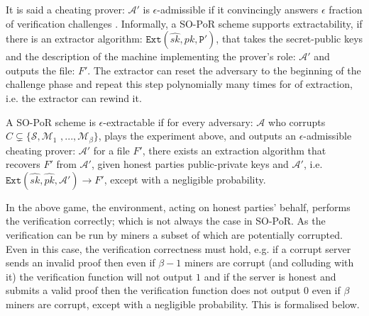 It is said a cheating prover: $\mathcal{A}'$ is $\epsilon$-admissible if it convincingly answers $\epsilon$ fraction of verification challenges \cite{DBLP:conf/asiacrypt/ShachamW08}. Informally, a SO-PoR scheme supports extractability, if there is an extractor algorithm: $\mathtt{Ext}(\hat{sk},\hat{pk},\mathtt{P}')$, that takes the secret-public keys and the description of the  machine implementing the prover's role: $\mathcal{A}'$ and outputs the file: $F'$. The extractor can reset the adversary to the beginning of the challenge phase and repeat this step polynomially many times for  of extraction, i.e. the extractor can rewind it.

\begin{definition}\label{extractable} A SO-PoR scheme is $\epsilon$-extractable if  for every adversary: $\mathcal{A}$ who corrupts $C\subsetneq\{\mathcal{S},\mathcal{M}_{\scriptscriptstyle 1} $ $,..., \mathcal{M}_{\scriptscriptstyle\beta}\}$, plays the experiment above, and outputs an $\epsilon$-admissible cheating prover: $\mathcal{A}'$ for a file $F'$,  there exists an extraction algorithm that recovers $F'$ from $\mathcal{A}'$, given honest parties public-private keys and $\mathcal{A}'$,  i.e. $\mathtt{Ext}(\hat{sk},\hat{pk},\mathcal{A}')\rightarrow F'$, except with a negligible probability. 
\end{definition}


In the above game, the environment, acting on honest parties' behalf, performs the verification correctly; which is not always the case in SO-PoR. As the verification can be run by miners a subset of which are potentially corrupted. Even in this case, the verification correctness must hold, e.g.  if a corrupt server sends an  invalid proof then even if $\beta-1$ miners are corrupt (and colluding with it) the verification function will not output $1$ and if the server is honest and submits a valid proof then the verification function does not output $0$ even if $\beta$ miners are corrupt, except with a negligible probability. This is formalised below. 


